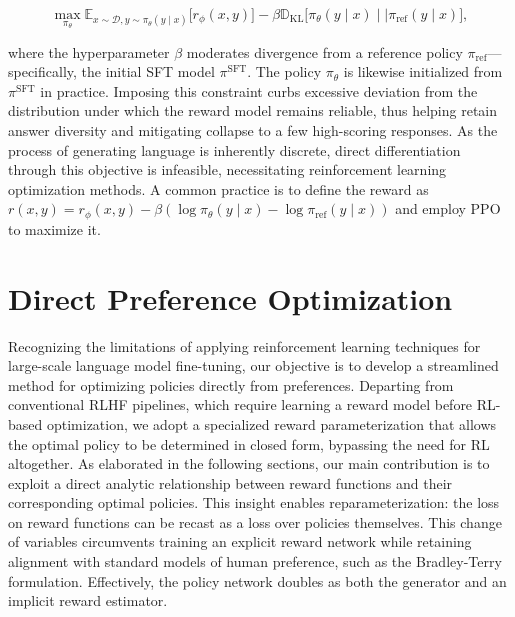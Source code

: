 \begin{equation}\label{eq:RL}
\max_{\pi_{\theta}}  \mathbb{E}_{x\sim \mathcal{D}, y\sim \pi_{\theta}(y \mid x)}\bigl[r_{\phi}(x, y)\bigr] - \beta\mathbb{D}_{\textrm{KL}}\bigl[\pi_{\theta}(y\mid x)\mid \mid \pi_\text{ref}(y\mid x)\bigr],
\end{equation}

where the hyperparameter $\beta$ moderates divergence from a reference policy $\pi_\text{ref}$—specifically, the initial SFT model $\pi^\text{SFT}$. The policy $\pi_\theta$ is likewise initialized from $\pi^\text{SFT}$ in practice. Imposing this constraint curbs excessive deviation from the distribution under which the reward model remains reliable, thus helping retain answer diversity and mitigating collapse to a few high-scoring responses. As the process of generating language is inherently discrete, direct differentiation through this objective is infeasible, necessitating reinforcement learning optimization methods. A common practice \citep{ziegler2020finetuning, stiennon2022learning, bai2022training, ouyang2022training} is to define the reward as ${r(x, y) = r_{\phi}(x, y) -\beta (\log \pi_{\theta}(y\mid x) - \log \pi_\text{ref}(y\mid x))}$ and employ PPO \cite{schulman2017proximal} to maximize it.

\section{Direct Preference Optimization}\label{sec:DPO}

Recognizing the limitations of applying reinforcement learning techniques for large-scale language model fine-tuning, our objective is to develop a streamlined method for optimizing policies directly from preferences. Departing from conventional RLHF pipelines, which require learning a reward model before RL-based optimization, we adopt a specialized reward parameterization that allows the optimal policy to be determined in closed form, bypassing the need for RL altogether. As elaborated in the following sections, our main contribution is to exploit a direct analytic relationship between reward functions and their corresponding optimal policies. This insight enables reparameterization: the loss on reward functions can be recast as a loss over policies themselves. This change of variables circumvents training an explicit reward network while retaining alignment with standard models of human preference, such as the Bradley-Terry formulation. Effectively, the policy network doubles as both the generator and an implicit reward estimator.

